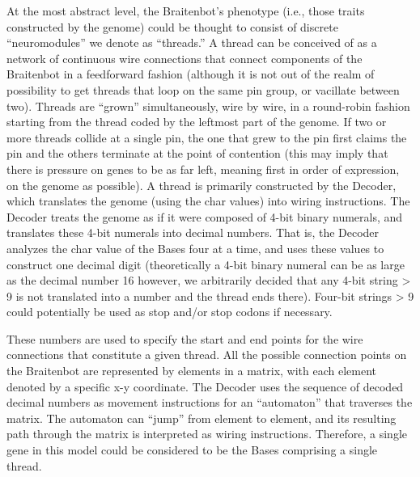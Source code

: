 \documentclass[11pt]{article}
\begin{document}
\begin{itemize}
At the most abstract level, the Braitenbot’s phenotype (i.e., those traits constructed by the genome) could be thought to consist of discrete “neuromodules” we denote as “threads.” A thread can be conceived of as a network of continuous wire connections that connect components of the Braitenbot in a feedforward fashion (although it is not out of the realm of possibility to get threads that loop on the same pin group, or vacillate between two). Threads are “grown” simultaneously, wire by wire, in a round-robin fashion starting from the thread coded by the leftmost part of the genome. If two or more threads collide at a single pin, the one that grew to the pin first claims the pin and the others terminate at the point of contention (this may imply that there is pressure on genes to be as far left, meaning first in order of expression, on the genome as possible).  A thread is primarily constructed by the Decoder, which translates the genome (using the char values) into wiring instructions.  The Decoder treats the genome as if it were composed of 4-bit binary numerals, and translates these 4-bit numerals into decimal numbers. That is, the Decoder analyzes the char value of the Bases four at a time, and uses these values to construct one decimal digit (theoretically a 4-bit binary numeral can be as large as the decimal number 16 however, we arbitrarily decided that any 4-bit string > 9 is not translated into a number and the thread ends there).  Four-bit strings > 9 could potentially be used as stop and/or stop codons if necessary.

These numbers are used to specify the start and end points for the wire connections that constitute a given thread. All the possible connection points on the Braitenbot are represented by elements in a matrix, with each element denoted by a specific x-y coordinate. The Decoder uses the sequence of decoded decimal numbers as movement instructions for an “automaton” that traverses the matrix. The automaton can “jump” from element to element, and its resulting path through the matrix is interpreted as wiring instructions. Therefore, a single gene in this model could be considered to be the Bases comprising a single thread.


\end{itemize}
\end{document}
